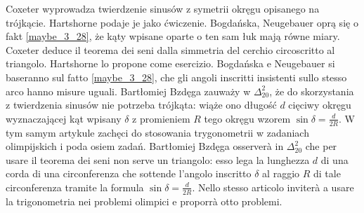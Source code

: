 Coxeter \cite[s. 28, 29]{coxeter_1967} wyprowadza twierdzenie sinusów z symetrii okręgu opisanego na trójkącie. %
Hartshorne \cite[s. 185]{hartshorne_2000} podaje je jako ćwiczenie. %
Bogdańska, Neugebauer \cite[s. 89]{neugebauer_2018} oprą się o fakt \ref{maybe_3_28}, że kąty wpisane oparte o ten sam łuk mają równe miary. %
Coxeter \cite[pp. 28, 29]{coxeter_1967} deduce il teorema dei seni dalla simmetria del cerchio circoscritto al triangolo. %
Hartshorne \cite[p. 185]{hartshorne_2000} lo propone come esercizio. %
Bogdańska e Neugebauer \cite[p. 89]{neugebauer_2018} si baseranno sul fatto \ref{maybe_3_28}, che gli angoli inscritti insistenti sullo stesso arco hanno misure uguali. %
Bartłomiej Bzdęga zauważy w $\Delta_{20}^{2}$, że do skorzystania z twierdzenia sinusów nie potrzeba trójkąta: wiąże ono długość $d$ cięciwy okręgu wyznaczającej kąt wpisany $\delta$ z promieniem $R$ tego okręgu wzorem $\sin \delta = \frac{d}{2R}$. %
W tym samym artykule zachęci do stosowania trygonometrii w zadaniach olimpijskich i poda osiem zadań. %
Bartłomiej Bzdęga osserverà in $\Delta_{20}^{2}$ che per usare il teorema dei seni non serve un triangolo: esso lega la lunghezza $d$ di una corda di una circonferenza che sottende l'angolo inscritto $\delta$ al raggio $R$ di tale circonferenza tramite la formula $\sin \delta = \frac{d}{2R}$. %
Nello stesso articolo inviterà a usare la trigonometria nei problemi olimpici e proporrà otto problemi. %

%